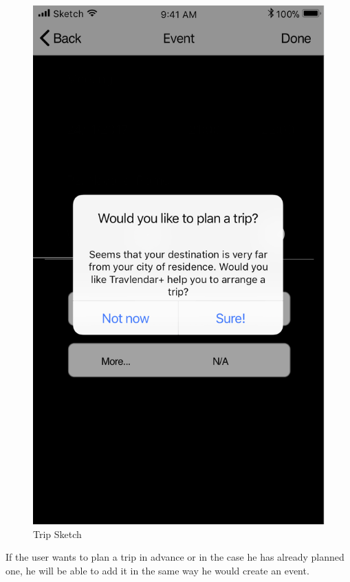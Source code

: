 \begin{enumerate}
\begin{figure}[H]
				\includegraphics[scale=0.25]{Images/Sketch/Trip_3}
				\caption{Trip Sketch}
			\end{figure}
			If the user wants to plan a trip in advance or in the case he has already planned one, he will be able to add it in the same way he would create an event.
			\begin{figure}[H]
				\centering

\end{figure}
\end{enumerate}
